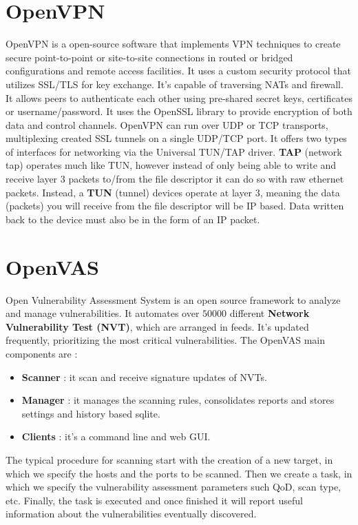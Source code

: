 \documentclass[11pt]{article}
\begin{document}
\begin{appendices}
\section{OpenVPN}
OpenVPN is a open-source software that implements VPN techniques to create secure point-to-point or site-to-site connections in routed or bridged configurations and remote access facilities. It uses a custom security protocol that utilizes SSL/TLS for key exchange. It's capable of traversing NATs and firewall. It allows peers to authenticate each other using pre-shared secret keys, certificates or username/password. It uses the OpenSSL library to provide encryption of both data and control channels. OpenVPN can run over UDP or TCP transports, multiplexing created SSL tunnels on a single UDP/TCP port. It offers two types of interfaces for networking via the Universal TUN/TAP driver. \textbf{TAP} (network tap) operates much like TUN, however instead of only being able to write and receive layer $3$ packets to/from the file descriptor it can do so with raw ethernet packets. Instead, a \textbf{TUN} (tunnel) devices operate at layer $3$, meaning the data (packets) you will receive from the file descriptor will be IP based. Data written back to the device must also be in the form of an IP packet.
\section{OpenVAS}
Open Vulnerability Assessment System is an open source framework to analyze and manage vulnerabilities. It automates over $50000$ different \textbf{Network Vulnerability Test (NVT)}, which are arranged in feeds. It's updated frequently, prioritizing the most critical vulnerabilities. The OpenVAS main components are :
\begin{itemize}
\item \textbf{Scanner} : it scan and receive signature updates of NVTs.
\item \textbf{Manager} : it manages the scanning rules, consolidates reports and stores settings and history based sqlite.
\item \textbf{Clients} : it's a command line and web GUI.
\end{itemize}
The typical procedure for scanning start with the creation of a new target, in which we specify the hosts and the ports to be scanned. Then we create a task, in which we specify the vulnerability assessment parameters such QoD, scan type, etc. Finally, the task is executed and once finished it will report useful information about the vulnerabilities eventually discovered.
\end{appendices}


\end{document}
